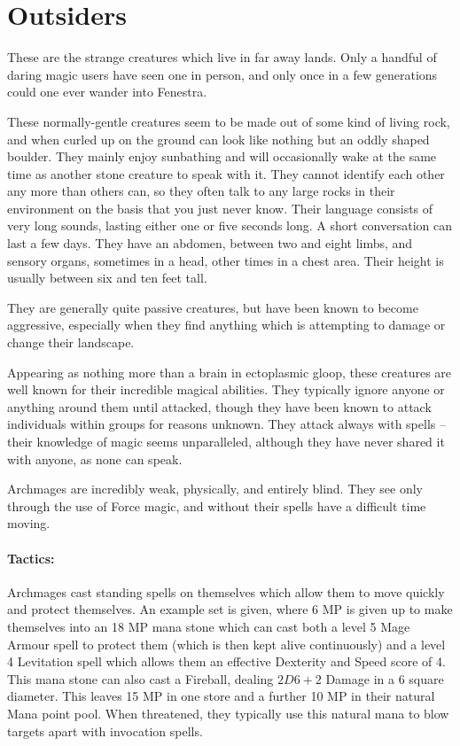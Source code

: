\section{Outsiders}

\begin{multicols}{2}

These are the strange creatures which live in far away lands.  Only a handful of daring magic users have seen one in person, and only once in a few generations could one ever wander into Fenestra.

\label{rockman}

These normally-gentle creatures seem to be made out of some kind of living rock, and when curled up on the ground can look like nothing but an oddly shaped boulder.
They mainly enjoy sunbathing and will occasionally wake at the same time as another stone creature to speak with it.
They cannot identify each other any more than others can, so they often talk to any large rocks in their environment on the basis that you just never know.
Their language consists of very long sounds, lasting either one or five seconds long.
A short conversation can last a few days.
They have an abdomen, between two and eight limbs, and sensory organs, sometimes in a head, other times in a chest area.
Their height is usually between six and ten feet tall.

They are generally quite passive creatures, but have been known to become aggressive, especially when they find anything which is attempting to damage or change their landscape.

\rockman

\label{archmage}

Appearing as nothing more than a brain in ectoplasmic gloop, these creatures are well known for their incredible magical abilities.
They typically ignore anyone or anything around them until attacked, though they have been known to attack individuals within groups for reasons unknown.
They attack always with spells -- their knowledge of magic seems unparalleled, although they have never shared it with anyone, as none can speak.

Archmages are incredibly weak, physically, and entirely blind.
They see only through the use of Force magic, and without their spells have a difficult time moving.

\paragraph{Tactics:} Archmages cast standing spells on themselves which allow them to move quickly and protect themselves.
An example set is given, where 6 MP is given up to make themselves into an 18 MP mana stone which can cast both a level 5 Mage Armour spell to protect them (which is then kept alive continuously) and a level 4 Levitation spell which allows them an effective Dexterity and Speed score of 4.
This mana stone can also cast a Fireball, dealing $2D6+2$ Damage in a 6 square diameter.
This leaves 15 MP in one store and a further 10 MP in their natural Mana point pool.
When threatened, they typically use this natural mana to blow targets apart with invocation spells.


\end{multicols}

